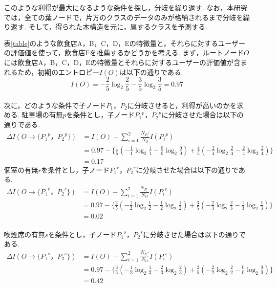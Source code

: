 \documentclass[12pt,a4j]{jreport}
\begin{document}
このような利得が最大になるような条件を探し，分岐を繰り返す.
なお，本研究では，全ての葉ノードで，片方のクラスのデータのみが格納されるまで分岐を繰り返す.
そして，得られた木構造を元に，属するクラスを予測する.

表\ref{table}のような飲食店A，B，C，D，Eの特徴量と，それらに対するユーザーの評価値を使って，飲食店Fを推薦するかどうかを考える.
まず，ルートノード\(O\)には飲食店A，B，C，D，Eの特徴量とそれらに対するユーザーの評価値が含まれるため，初期のエントロピー\(I(O)\)は以下の通りである.\\
\[
I(O) = - \frac{2}{5} \log_2 \frac{2}{5} - \frac{3}{5} \log_2 \frac{3}{5} = 0.97
\]\\
次に，どのような条件で子ノード\(P_1，P_2\)に分岐させると，利得が高いのかを求める.
駐車場の有無\(p\)を条件とし，子ノード\({P_1}^p，{P_2}^p\)に分岐させた場合は以下の通りである.\\

\begin{align*}
  \Delta I(O→\{{P_1}^p，{P_2}^p\}) 
  &= I(O) - \sum_{i=1}^{2} \frac{N_{{P_i}^p}}{N_O} I({P_i}^p)\\ 
  &= 0.97 - \{\frac{1}{5} (- \frac{1}{1} \log_2 \frac{1}{1} - \frac{0}{0} \log_2 \frac{0}{0}) + \frac{4}{5} (- \frac{2}{4} \log_2 \frac{2}{4} - \frac{2}{4} \log_2 \frac{2}{4})\}\\
  &= 0.17
\end{align*}
個室の有無\(r\)を条件とし，子ノード\({P_1}^r，{P_2}^r\)に分岐させた場合は以下の通りである.\\

\begin{align*}
  \Delta I(O→\{{P_1}^r，{P_2}^r\}) 
  &= I(O) - \sum_{i=1}^{2} \frac{N_{{P_i}^r}}{N_O} I({P_i}^r)\\ 
  &= 0.97 - \{\frac{2}{5} (- \frac{1}{2} \log_2 \frac{1}{2} - \frac{1}{2} \log_2 \frac{1}{2}) + \frac{3}{5} (- \frac{2}{3} \log_2 \frac{2}{3} - \frac{1}{3} \log_2 \frac{1}{3})\}\\
  &= 0.02
\end{align*}\\
喫煙席の有無\(s\)を条件とし，子ノード\({P_1}^s，{P_2}^s\)に分岐させた場合は以下の通りである.\\

\begin{align*}
  \Delta I(O→\{{P_1}^s，{P_2}^s\}) 
  &= I(O) - \sum_{i=1}^{2} \frac{N_{{P_i}^s}}{N_O} I({P_i}^s)\\ 
  &= 0.97 - \{\frac{3}{5} (- \frac{1}{3} \log_2 \frac{1}{3} - \frac{2}{3} \log_2 \frac{2}{3}) + \frac{2}{5} (- \frac{2}{2} \log_2 \frac{2}{2} - \frac{0}{0} \log_2 \frac{0}{0})\}\\
  &= 0.42
\end{align*}\\
\end{document}
